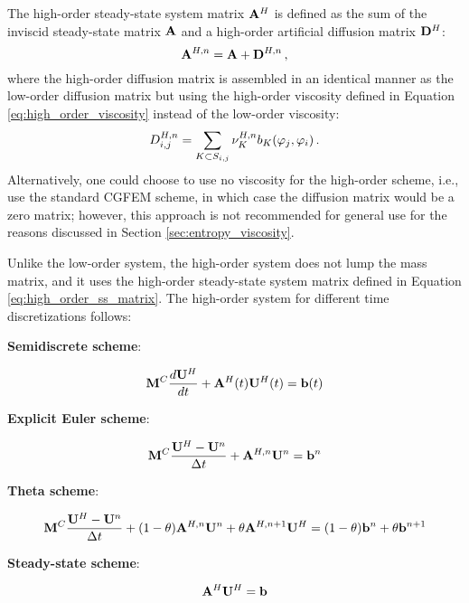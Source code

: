 The high-order steady-state system matrix $\highorderssmatrix$ is defined as
the sum of the inviscid steady-state matrix $\ssmatrix$ and a high-order
artificial diffusion matrix $\highorderdiffusionmatrix$:
\begin{equation}\label{eq:high_order_ss_matrix}
  \highorderssmatrix[\timeindex] = \ssmatrix
  + \highorderdiffusionmatrix[\timeindex] \eqc
\end{equation}
where the high-order diffusion matrix is assembled in an identical manner as
the low-order diffusion matrix but using the high-order viscosity defined in
Equation \eqref{eq:high_order_viscosity} instead of the low-order viscosity:
\begin{equation}
  \diffusionmatrixletter^{H,\timeindex}_{i,j}
  = \sumKSij\highordercellviscosity[\timeindex]
  \localviscbilinearform{\cellindex}{j}{i} \eqp
\end{equation}
Alternatively, one could choose to use no viscosity for the high-order scheme,
i.e., use the standard CGFEM scheme, in which case the diffusion matrix
would be a zero matrix; however, this approach is not recommended for general use
for the reasons discussed in Section \ref{sec:entropy_viscosity}.

Unlike the low-order system, the high-order system does not lump the
mass matrix, and it uses the high-order steady-state system matrix
defined in Equation \eqref{eq:high_order_ss_matrix}. The high-order
system for different time discretizations follows:
\begin{center}{\textbf{Semidiscrete scheme}:}\end{center}
\begin{equation}\label{eq:high_semidiscrete}
   \consistentmassmatrix\ddt{\highordersolution}
    + \highorderssmatrix(\timevalue)\highordersolution(\timevalue) 
    = \ssrhs(\timevalue)
\end{equation}
\begin{center}{\textbf{Explicit Euler scheme}:}\end{center}
\begin{equation}\label{eq:high_FE}
  \consistentmassmatrix\frac{\highordersolution-\solutionvector^{\timeindex}}
  {\timestepsize}
  + \highorderssmatrix[\timeindex]\solutionvector^{\timeindex}
  = \ssrhs^\timeindex
\end{equation}
\begin{center}{\textbf{Theta scheme}:}\end{center}
\begin{equation}\label{eq:high_theta}
  \consistentmassmatrix\frac{\highordersolution-\solutionvector^\timeindex}
  {\timestepsize}
  + (1-\theta)\highorderssmatrix[\timeindex]\solutionvector^\timeindex
  + \theta\highorderssmatrix[\timeindex+1]\highordersolution
  = (1-\theta)\ssrhs^\timeindex + \theta\ssrhs^{\timeindex+1}
\end{equation}
\begin{center}{\textbf{Steady-state scheme}:}\end{center}
\begin{equation}\label{eq:high_ss}
   \highorderssmatrix\highordersolution = \ssrhs
\end{equation}

